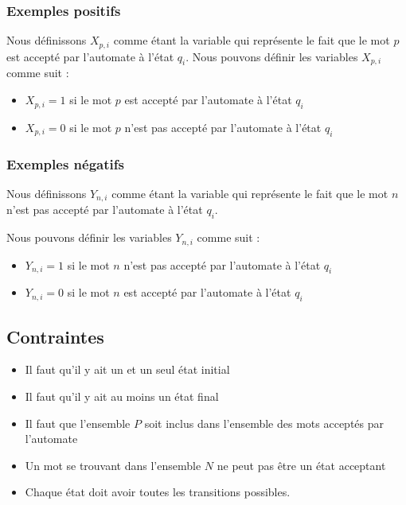 \documentclass[a4paper, 12pt]{extarticle}
\begin{document}

\subsubsection{Exemples positifs} %
\label{sec:exemples_positifs}

Nous définissons $X_{p, i}$ comme étant la variable qui représente le fait que le mot $p$ est accepté par l'automate à l'état $q_i$.
Nous pouvons définir les variables $X_{p, i}$ comme suit : 
\begin{itemize}[label=$\bullet$]
    \item $X_{p, i} = 1$ si le mot $p$ est accepté par l'automate à l'état $q_i$ 
    \item $X_{p, i} = 0$ si le mot $p$ n'est pas accepté par l'automate à l'état $q_i$ 
\end{itemize}


\subsubsection{Exemples négatifs} %
\label{sec:exemples_negatifs} 

Nous définissons $Y_{n, i}$ comme étant la variable qui représente le fait que le mot $n$ n'est pas accepté par l'automate à l'état $q_i$. 

Nous pouvons définir les variables $Y_{n, i}$ comme suit : 
\begin{itemize}[label=$\bullet$]
    \item $Y_{n, i} = 1$ si le mot $n$ n'est pas accepté par l'automate à l'état $q_i$ 
    \item $Y_{n, i} = 0$ si le mot $n$ est accepté par l'automate à l'état $q_i$ 
\end{itemize}


\subsection{Contraintes} %
\label{sub:contraintes}

\begin{itemize}
    \item Il faut qu'il y ait un et un seul état initial 
    \item Il faut qu'il y ait au moins un état final
    \item Il faut que l'ensemble $P$ soit inclus dans l'ensemble des mots acceptés par l'automate 
    \item Un mot se trouvant dans l'ensemble $N$ ne peut pas être un état acceptant
    \item Chaque état doit avoir toutes les transitions possibles. 
\end{itemize}
\end{document}

